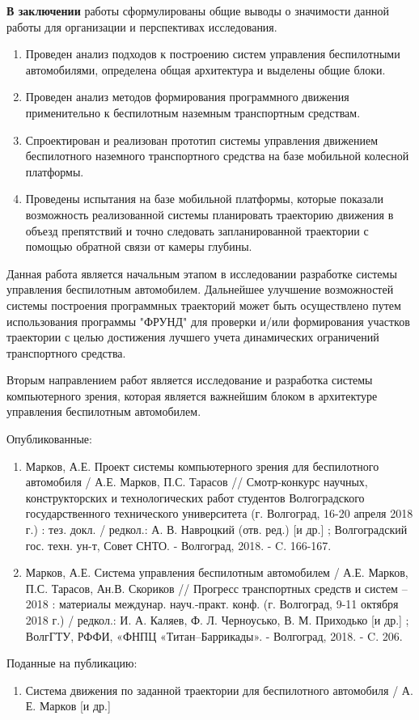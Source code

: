 \textbf{В заключении} работы сформулированы общие выводы о значимости данной работы для
организации и перспективах исследования.

\begin{enumerate}
    \item Проведен анализ подходов к построению систем управления беспилотными
          автомобилями, определена общая архитектура и выделены общие блоки.
    \item Проведен анализ методов формирования программного движения применительно к беспилотным наземным транспортным
          средствам.
    \item Спроектирован и реализован прототип системы управления движением беспилотного
          наземного транспортного средства на базе мобильной колесной платформы.
    \item Проведены испытания на базе мобильной платформы, которые показали возможность
          реализованной системы планировать траекторию движения в объезд препятствий и
          точно следовать запланированной траектории с помощью обратной связи от камеры глубины.

\end{enumerate}

Данная работа является начальным этапом в исследовании разработке системы управления
беспилотным автомобилем.
Дальнейшее улучшение возможностей системы построения программных траекторий может быть осуществлено путем использования
программы "ФРУНД" для проверки и/или формирования участков траектории с целью достижения лучшего учета динамических
ограничений транспортного средства.

Вторым направлением работ является исследование и разработка системы компьютерного зрения,
которая является важнейшим блоком в архитектуре управления беспилотным автомобилем.

Опубликованные:
\begin{enumerate}
    \item Марков, А.Е. Проект системы компьютерного зрения для беспилотного автомобиля / А.Е. Марков, П.С. Тарасов
          // Смотр-конкурс научных, конструкторских и технологических работ студентов Волгоградского государственного
          технического университета (г. Волгоград, 16-20 апреля 2018 г.) : тез. докл. / редкол.: А. В. Навроцкий (отв. ред.)
          [и др.] ; Волгоградский гос. техн. ун-т, Совет СНТО. - Волгоград, 2018. - C. 166-167.
    \item  Марков, А.Е. Система управления беспилотным автомобилем / А.Е. Марков, П.С. Тарасов, Ан.В. Скориков //
           Прогресс транспортных средств и систем – 2018 : материалы междунар. науч.-практ. конф. (г. Волгоград,
           9-11 октября 2018 г.) / редкол.: И. А. Каляев, Ф. Л. Черноусько, В. М. Приходько [и др.] ; ВолгГТУ, РФФИ,
           «ФНПЦ «Титан–Баррикады». - Волгоград, 2018. - C. 206.
\end{enumerate}

\bigskip
Поданные на публикацию:
\begin{enumerate}
    \item Система движения по заданной траектории для беспилотного автомобиля / А. Е. Марков [и др.]
\end{enumerate}


